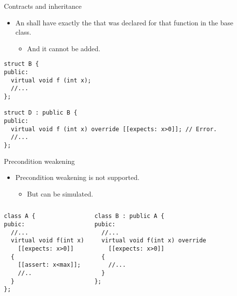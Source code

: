 \begin{frame}[t,fragile]{Contracts and inheritance}
\begin{itemize}
  \item An  shall have exactly the  that was declared for that function in the base class.
    \begin{itemize}
      \item And it cannot be added.
    \end{itemize}
\end{itemize}

\vfill\pause

\begin{lstlisting}
struct B {
public:
  virtual void f (int x);
  //...
};

struct D : public B {
public:
  virtual void f (int x) override [[expects: x>0]]; // Error.
  //...
};
\end{lstlisting}
\end{frame}

\begin{frame}[t,fragile]{Precondition weakening}
\begin{itemize}
  \item Precondition weakening is not supported.
    \begin{itemize}
      \item But can be simulated.
    \end{itemize}
\end{itemize}

\vfill\pause
\begin{columns}[T]

\begin{lstlisting}
class A {
pubic:
  //...
  virtual void f(int x)
    [[expects: x>0]]
  {
    [[assert: x<max]];
    //..
  }
};
\end{lstlisting}

\begin{lstlisting}
class B : public A {
pubic:
  //...
  virtual void f(int x) override
    [[expects: x>0]]
  {
    //...
  }
};
\end{lstlisting}

\end{columns}
\end{frame}

